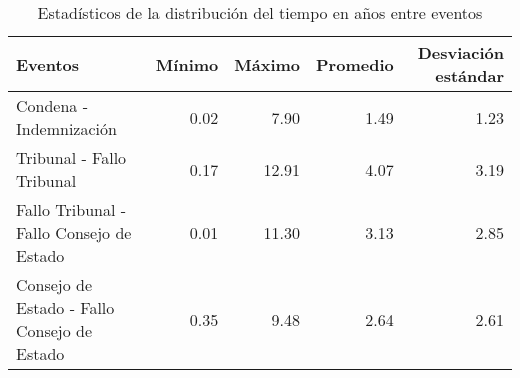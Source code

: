 \begin{table}[h]
\centering
\caption{Estadísticos de la distribución del
tiempo en años entre eventos} 
\label{tab:eventos3}
\begin{tabular}{p{6cm}rrrr}
  \hline
Eventos & Mínimo & Máximo & Promedio & Desviación estándar \\ 
  \hline
Condena - Indemnización & 0.02 & 7.90 & 1.49 & 1.23 \\ 
  Tribunal - Fallo Tribunal & 0.17 & 12.91 & 4.07 & 3.19 \\ 
  Fallo Tribunal - Fallo Consejo de Estado & 0.01 & 11.30 & 3.13 & 2.85 \\ 
  Consejo de Estado - Fallo Consejo de Estado & 0.35 & 9.48 & 2.64 & 2.61 \\ 
   \hline
\end{tabular}
\end{table}
